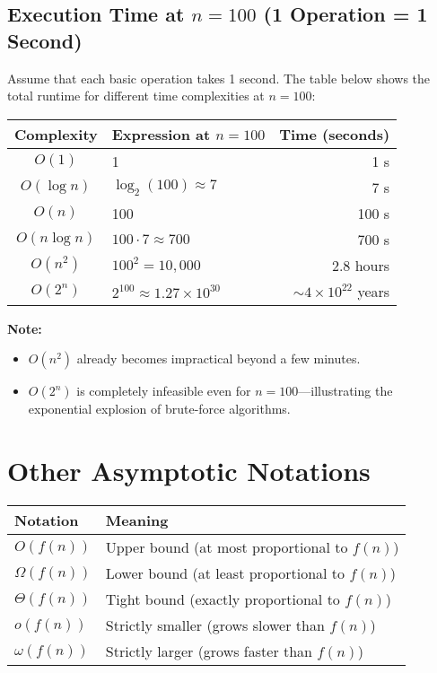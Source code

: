 \documentclass{article}
\begin{document}
\subsection*{Execution Time at $n = 100$ (1 Operation = 1 Second)}

Assume that each basic operation takes 1 second. The table below shows the total runtime for different time complexities at $n = 100$:

\begin{center}
\begin{tabular}{|c|l|r|}
\hline
\textbf{Complexity} & \textbf{Expression at $n = 100$} & \textbf{Time (seconds)} \\
\hline
$O(1)$         & 1                         & 1 s \\
$O(\log n)$    & $\log_2(100) \approx 7$   & 7 s \\
$O(n)$         & 100                       & 100 s \\
$O(n \log n)$  & $100 \cdot 7 \approx 700$ & 700 s \\
$O(n^2)$       & $100^2 = 10,\!000$        & 2.8 hours \\
$O(2^n)$       & $2^{100} \approx 1.27 \times 10^{30}$ & $\sim 4 \times 10^{22}$ years \\
\hline
\end{tabular}
\end{center}

\textbf{Note:} 
\begin{itemize}
    \item $O(n^2)$ already becomes impractical beyond a few minutes.
    \item $O(2^n)$ is completely infeasible even for $n = 100$—illustrating the exponential explosion of brute-force algorithms.
\end{itemize}

\section{Other Asymptotic Notations}

\begin{tabular}{ll}
\toprule
Notation & Meaning \\
\midrule
$O(f(n))$  & Upper bound (at most proportional to $f(n)$) \\
$\Omega(f(n))$ & Lower bound (at least proportional to $f(n)$) \\
$\Theta(f(n))$ & Tight bound (exactly proportional to $f(n)$) \\
$o(f(n))$  & Strictly smaller (grows slower than $f(n)$) \\
$\omega(f(n))$ & Strictly larger (grows faster than $f(n)$) \\
\bottomrule
\end{tabular}
\end{document}
